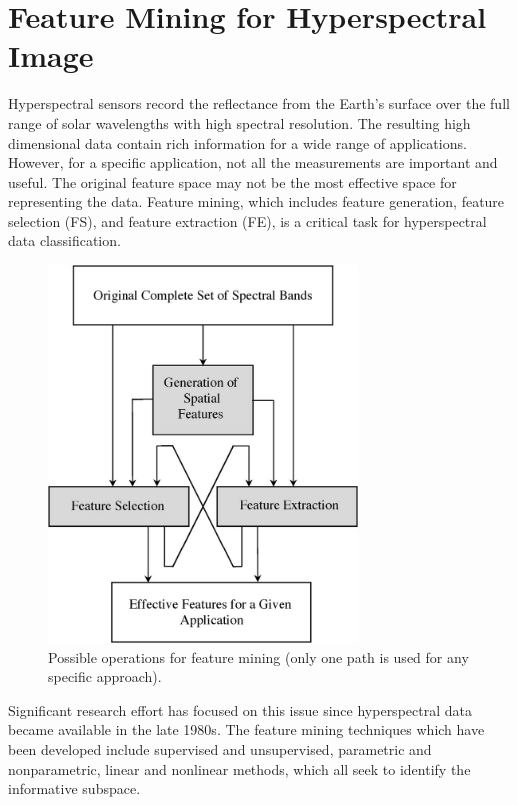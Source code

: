 \documentclass[document.tex]{subfiles}
\begin{document}
\section{Feature Mining for Hyperspectral Image}
\noindent Hyperspectral sensors record the reflectance from the Earth’s surface over the full range
of solar wavelengths with high spectral resolution. The resulting high dimensional data
contain rich information for a wide range of applications. However, for a specific application, not all the measurements are important and useful. The original feature space may
not be the most effective space for representing the data. Feature mining, which includes
feature generation, feature selection (FS), and feature extraction (FE), is a critical task for hyperspectral data classification. 
\begin{figure}[H]
	\begin{center}
		\includegraphics[height=10.0cm]{imgs/OperationFeatureMining.jpg}
	\end{center}
	\caption{Possible operations for feature mining (only one path is used for any specific
		approach).\cite{2}}
	\label{fig:Possible operations for feature mining (only one path is used for any specific
		approach).}
\end{figure}
\noindent Significant research effort has focused on this issue since hyperspectral data became available in the late 1980s. The feature mining techniques which have been developed include supervised and unsupervised, parametric and
nonparametric, linear and nonlinear methods, which all seek to identify the informative
subspace.
\end{document}
